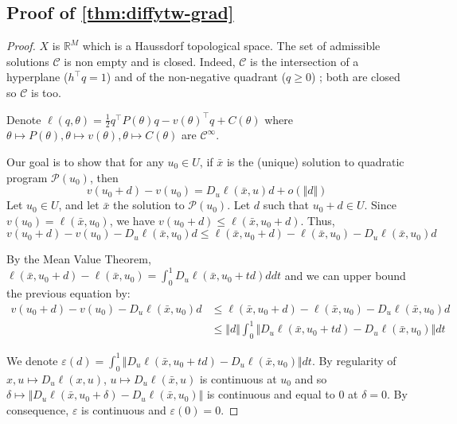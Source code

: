 \subsection{Proof of \cref{thm:diffytw-grad}}\label{sec:proof-diffytw-grad}
\begin{proof}
    $X$ is $\mathbb R^M$ which is a Haussdorf topological space. The set of admissible solutions $\mathcal C$ is non empty and is closed. Indeed, $\mathcal C$ is the intersection of a hyperplane ($h^\top q=1$) and of the non-negative quadrant ($q \geq 0$) ; both are closed so $\mathcal C$ is too.

    Denote $\ell(q, \theta) = \frac{1}{2}q^\top P(\theta) q - v(\theta)^\top q + C(\theta)$ where $\theta \mapsto P(\theta), \theta \mapsto v(\theta), \theta \mapsto C(\theta)$ are $\mathcal C^\infty$.

   Our goal is to show that for any $u_0\in U$, if $\bar x$ is the (unique) solution to quadratic program $\mathcal P(u_0)$, then
   \begin{equation}\label{eq:goal}
       v(u_0 + d) - v(u_0) = D_u \ell(\bar x, u)d + o\left(\Vert d\Vert\right)
   \end{equation}
   Let $u_0 \in U$, and let $\bar x$ the solution to $\mathcal P(u_0)$. Let $d$ such that $u_0 + d \in U$. Since $v(u_0) = \ell(\bar x, u_0)$, we have $v(u_0+d) \leq \ell(\bar x, u_0 + d)$. Thus,
   \begin{equation}
       v(u_0 + d) - v(u_0) - D_u\ell(\bar x, u_0)d \leq \ell(\bar x, u_0 + d) - \ell(\bar x, u_0) - D_u \ell(\bar x, u_0)d
   \end{equation}

    By the Mean Value Theorem, $\ell(\bar x, u_0 + d) - \ell(\bar x, u_0) = \int_0^1 D_u\ell(\bar x, u_0 + td)ddt$ and we can upper bound the previous equation by:
   \begin{align}
       v(u_0 + d) - v(u_0) - D_u\ell(\bar x, u_0)d&\leq \ell(\bar x, u_0 + d) - \ell(\bar x, u_0) - D_u \ell(\bar x, u_0)d\\
        &\leq \Vert d\Vert \int_0^1 \Vert D_u\ell(\bar x, u_0 +td) - D_u\ell(\bar x, u_0)\Vert dt
   \end{align}

   We denote $\varepsilon(d)= \int_0^1 \Vert D_u\ell(\bar x, u_0 +td) - D_u\ell(\bar x, u_0)\Vert dt$. By regularity of $x, u \mapsto D_u\ell(x, u)$, $u \mapsto D_u\ell(\bar x, u)$ is continuous at $u_0$ and so $ \delta \mapsto \Vert D_u\ell(\bar x, u_0 + \delta) -D_u\ell(\bar x, u_0)\Vert$ is continuous and equal to $0$ at $\delta=0$. By consequence, $\varepsilon$ is continuous and $\varepsilon(0)=0$.


\end{proof}
